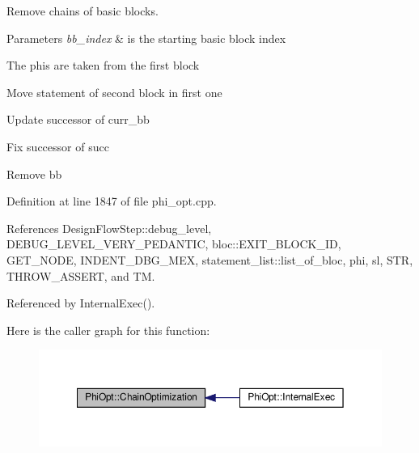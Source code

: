 Remove chains of basic blocks. 


\begin{DoxyParams}{Parameters}
{\em bb\+\_\+index} & is the starting basic block index \\
\hline
\end{DoxyParams}
The phis are taken from the first block

Move statement of second block in first one

Update successor of curr\+\_\+bb

Fix successor of succ

Remove bb 

Definition at line 1847 of file phi\+\_\+opt.\+cpp.



References Design\+Flow\+Step\+::debug\+\_\+level, D\+E\+B\+U\+G\+\_\+\+L\+E\+V\+E\+L\+\_\+\+V\+E\+R\+Y\+\_\+\+P\+E\+D\+A\+N\+T\+IC, bloc\+::\+E\+X\+I\+T\+\_\+\+B\+L\+O\+C\+K\+\_\+\+ID, G\+E\+T\+\_\+\+N\+O\+DE, I\+N\+D\+E\+N\+T\+\_\+\+D\+B\+G\+\_\+\+M\+EX, statement\+\_\+list\+::list\+\_\+of\+\_\+bloc, phi, sl, S\+TR, T\+H\+R\+O\+W\+\_\+\+A\+S\+S\+E\+RT, and TM.



Referenced by Internal\+Exec().

Here is the caller graph for this function\+:
\nopagebreak
\begin{figure}[H]
\begin{center}
\leavevmode
\includegraphics[width=350pt]{dc/ddf/classPhiOpt_a128433a1cf7590534b3f9f990fb19683_icgraph}
\end{center}
\end{figure}
\mbox{\label{classPhiOpt_ab3c872c6509a082eb92c957a6afc1de1}} 
